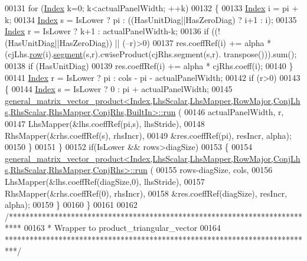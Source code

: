 \begin{DoxyCode}
00131       \textcolor{keywordflow}{for} (\hyperlink{namespace_eigen_a62e77e0933482dafde8fe197d9a2cfde}{Index} k=0; k<actualPanelWidth; ++k)
00132       \{
00133         \hyperlink{namespace_eigen_a62e77e0933482dafde8fe197d9a2cfde}{Index} i = pi + k;
00134         \hyperlink{namespace_eigen_a62e77e0933482dafde8fe197d9a2cfde}{Index} s = IsLower ? pi  : ((HasUnitDiag||HasZeroDiag) ? i+1 : i);
00135         \hyperlink{namespace_eigen_a62e77e0933482dafde8fe197d9a2cfde}{Index} r = IsLower ? k+1 : actualPanelWidth-k;
00136         \textcolor{keywordflow}{if} ((!(HasUnitDiag||HasZeroDiag)) || (--r)>0)
00137           res.coeffRef(i) += alpha * (cjLhs.\hyperlink{group___sparse_core___module_ae88b0ad6d31daa53e298b9cc4201fdee}{row}(i).\hyperlink{group___sparse_core___module_adf94a8461a773fb4b0daedaa9980b054}{segment}(s,r).cwiseProduct(cjRhs.segment(s,r).
      transpose())).sum();
00138         \textcolor{keywordflow}{if} (HasUnitDiag)
00139           res.coeffRef(i) += alpha * cjRhs.coeff(i);
00140       \}
00141       \hyperlink{namespace_eigen_a62e77e0933482dafde8fe197d9a2cfde}{Index} r = IsLower ? pi : cols - pi - actualPanelWidth;
00142       \textcolor{keywordflow}{if} (r>0)
00143       \{
00144         \hyperlink{namespace_eigen_a62e77e0933482dafde8fe197d9a2cfde}{Index} s = IsLower ? 0 : pi + actualPanelWidth;
00145         
      \hyperlink{struct_eigen_1_1internal_1_1general__matrix__vector__product}{
      general\_matrix\_vector\_product<Index,LhsScalar,LhsMapper,RowMajor,ConjLhs,RhsScalar,RhsMapper,ConjRhs,BuiltIn>::run}
      (
00146             actualPanelWidth, r,
00147             LhsMapper(&lhs.coeffRef(pi,s), lhsStride),
00148             RhsMapper(&rhs.coeffRef(s), rhsIncr),
00149             &res.coeffRef(pi), resIncr, alpha);
00150       \}
00151     \}
00152     \textcolor{keywordflow}{if}(IsLower && rows>diagSize)
00153     \{
00154       
      \hyperlink{struct_eigen_1_1internal_1_1general__matrix__vector__product}{general\_matrix\_vector\_product<Index,LhsScalar,LhsMapper,RowMajor,ConjLhs,RhsScalar,RhsMapper,ConjRhs>::run}
      (
00155             rows-diagSize, cols,
00156             LhsMapper(&lhs.coeffRef(diagSize,0), lhsStride),
00157             RhsMapper(&rhs.coeffRef(0), rhsIncr),
00158             &res.coeffRef(diagSize), resIncr, alpha);
00159     \}
00160   \}
00161 
00162 \textcolor{comment}{/***************************************************************************}
00163 \textcolor{comment}{* Wrapper to product\_triangular\_vector}
00164 \textcolor{comment}{***************************************************************************/}

\end{DoxyCode}
